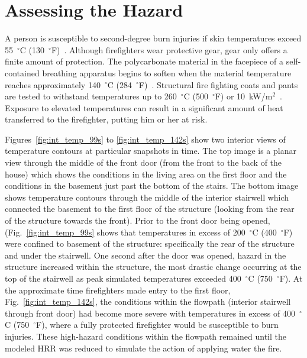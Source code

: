 \documentclass[12pt,oneside]{book}
\begin{document}
\clearpage

\section{Assessing the Hazard}
\label{assessing_hazard}
A person is susceptible to second-degree burn injuries if skin temperatures exceed 55~$^{\circ}$C (130~$^{\circ}$F)~\cite{contactburn}. Although firefighters wear protective gear, gear only offers a finite amount of protection. The polycarbonate material in the facepiece of a self-contained breathing apparatus begins to soften when the material temperature reaches approximately 140~$^{\circ}$C (284~$^{\circ}$F)~\cite{mensch2011emergency}. Structural fire fighting coats and pants are tested to withstand temperatures up to 260~$^{\circ}$C (500~$^{\circ}$F) or 10~kW/m$^2$~\cite{nfpa2013standard}. Exposure to elevated temperatures can result in a significant amount of heat transferred to the firefighter, putting him or her at risk.

Figures~\ref{fig:int_temp_99s} to \ref{fig:int_temp_142s} show two interior views of temperature contours at particular snapshots in time. The top image is a planar view through the middle of the front door (from the front to the back of the house) which shows the conditions in the living area on the first floor and the conditions in the basement just past the bottom of the stairs. The bottom image shows temperature contours through the middle of the interior stairwell which connected the basement to the first floor of the structure (looking from the rear of the structure towards the front). Prior to the front door being opened, (Fig.~\ref{fig:int_temp_99s} shows that temperatures in excess of 200~$^{\circ}$C (400~$^{\circ}$F) were confined to basement of the structure: specifically the rear of the structure and under the stairwell. One second after the door was opened, hazard in the structure increased within the structure, the most drastic change occurring at the top of the stairwell as peak simulated temperatures exceeded 400~$^{\circ}$C (750~$^{\circ}$F). At the approximate time firefighters made entry to the first floor, Fig.~\ref{fig:int_temp_142s}, the conditions within the flowpath (interior stairwell through front door) had become more severe with temperatures in excess of 400~$^{\circ}$C (750~$^{\circ}$F), where a fully protected firefighter would be susceptible to burn injuries. These high-hazard conditions within the flowpath remained until the modeled HRR was reduced to simulate the action of applying water the fire. 
\end{document}

